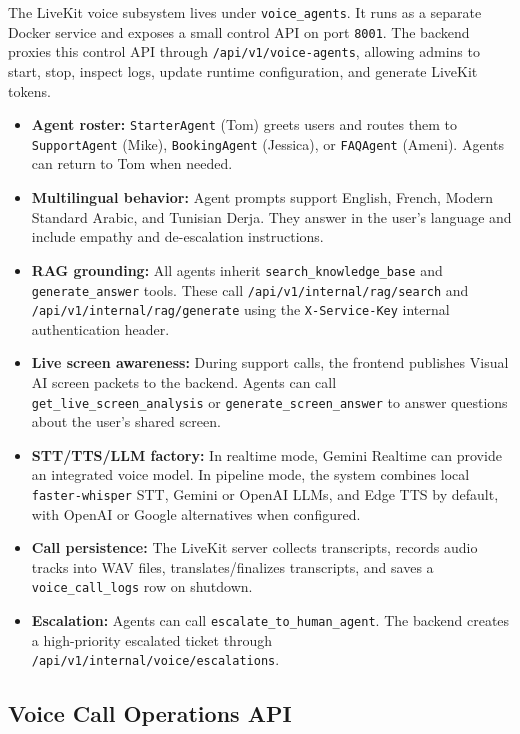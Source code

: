 The LiveKit voice subsystem lives under \texttt{voice\_agents}. It runs as a separate Docker service and exposes a small control API on port \texttt{8001}. The backend proxies this control API through \texttt{/api/v1/voice-agents}, allowing admins to start, stop, inspect logs, update runtime configuration, and generate LiveKit tokens.

\begin{itemize}
    \item \textbf{Agent roster:} \texttt{StarterAgent} (Tom) greets users and routes them to \texttt{SupportAgent} (Mike), \texttt{BookingAgent} (Jessica), or \texttt{FAQAgent} (Ameni). Agents can return to Tom when needed.
    \item \textbf{Multilingual behavior:} Agent prompts support English, French, Modern Standard Arabic, and Tunisian Derja. They answer in the user's language and include empathy and de-escalation instructions.
    \item \textbf{RAG grounding:} All agents inherit \texttt{search\_knowledge\_base} and \texttt{generate\_answer} tools. These call \texttt{/api/v1/internal/rag/search} and \texttt{/api/v1/internal/rag/generate} using the \texttt{X-Service-Key} internal authentication header.
    \item \textbf{Live screen awareness:} During support calls, the frontend publishes Visual AI screen packets to the backend. Agents can call \texttt{get\_live\_screen\_analysis} or \texttt{generate\_screen\_answer} to answer questions about the user's shared screen.
    \item \textbf{STT/TTS/LLM factory:} In realtime mode, Gemini Realtime can provide an integrated voice model. In pipeline mode, the system combines local \texttt{faster-whisper} STT, Gemini or OpenAI LLMs, and Edge TTS by default, with OpenAI or Google alternatives when configured.
    \item \textbf{Call persistence:} The LiveKit server collects transcripts, records audio tracks into WAV files, translates/finalizes transcripts, and saves a \texttt{voice\_call\_logs} row on shutdown.
    \item \textbf{Escalation:} Agents can call \texttt{escalate\_to\_human\_agent}. The backend creates a high-priority escalated ticket through \texttt{/api/v1/internal/voice/escalations}.
\end{itemize}

\subsection{Voice Call Operations API}

